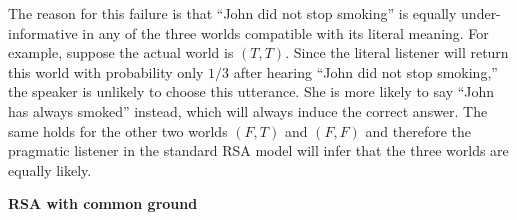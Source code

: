 The reason for this failure is that ``John did not stop smoking'' is equally
 under-informative in any of the three worlds compatible with its literal meaning.
For example, suppose the actual world is $(T, T)$. Since the 
 literal listener will return this world with probability only $1/3$ after hearing ``John did not stop smoking,'' the speaker is unlikely to choose this utterance.
She is more likely to say ``John has always smoked'' instead, which will always
 induce the correct answer. 
The same holds for the other two worlds $(F, T)$ and $(F,
 F)$ and therefore the pragmatic listener in the standard RSA model will 
 infer that the three worlds are equally likely.
 
\vspace{1ex}

\noindent\textbf{RSA with common ground}

